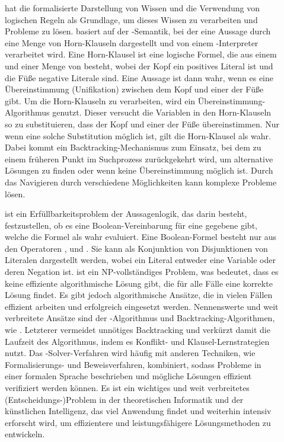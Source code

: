 \begin{description}
    \item[] hat die formalisierte Darstellung von Wissen und die Verwendung von logischen Regeln als Grundlage, um dieses Wissen zu verarbeiten und Probleme zu lösen.
     basiert auf der -Semantik, bei der eine Aussage durch eine Menge von Horn-Klauseln dargestellt und von einem -Interpreter verarbeitet wird.
    Eine Horn-Klausel ist eine logische Formel, die aus einem  und einer Menge von  besteht, wobei der Kopf ein positives Literal ist und die Füße negative Literale sind.
    Eine Aussage ist dann wahr, wenn es eine Übereinstimmung (Unifikation) zwischen dem Kopf und einer der Füße gibt.
    Um die Horn-Klauseln zu verarbeiten, wird ein Übereinstimmung-Algorithmus genutzt.
    Dieser versucht die Variablen in den Horn-Klauseln so zu substituieren, dass der Kopf und einer der Füße übereinstimmen.
    Nur wenn eine solche Substitution möglich ist, gilt die Horn-Klausel als wahr.
    Dabei kommt ein \sog Backtracking-Mechanismus zum Einsatz, bei dem zu einem früheren Punkt im Suchprozess zurückgekehrt wird, um alternative Lösungen zu finden oder wenn keine Übereinstimmung möglich ist.
    Durch das Navigieren durch verschiedene Möglichkeiten kann  komplexe Probleme lösen.

    \item[] ist ein Erfüllbarkeitsproblem der Aussagenlogik, das darin besteht, festzustellen, ob es eine Boolean-Vereinbarung für eine gegebene  gibt, welche die Formel als wahr evaluiert.
    Eine Boolean-Formel besteht nur aus den Operatoren ,  und .
    Sie kann als Konjunktion von Disjunktionen von Literalen dargestellt werden, wobei ein Literal entweder eine Variable oder deren Negation ist.
     ist ein NP-vollständiges Problem, was bedeutet, dass es keine effiziente algorithmische Lösung gibt, die für alle Fälle eine korrekte Lösung findet.
    Es gibt jedoch algorithmische Ansätze, die in vielen Fällen effizient arbeiten und erfolgreich eingesetzt werden.
    Nennenswerte und weit verbreitete Ansätze sind der -Algorithmus und Backtracking-Algorithmen, wie .
    Letzterer vermeidet unnötiges Backtracking und verkürzt damit die Laufzeit des Algorithmus, indem es Konflikt- und Klausel-Lernstrategien nutzt.
    Das -Solver-Verfahren wird häufig mit anderen Techniken, wie \zB Formalisierungs- und Beweisverfahren, kombiniert, sodass Probleme in einer formalen Sprache beschrieben und mögliche Lösungen effizient verifiziert werden können.
    Es ist ein wichtiges und weit verbreitetes (Entscheidungs-)Problem in der theoretischen Informatik und der künstlichen Intelligenz, das viel Anwendung findet und weiterhin intensiv erforscht wird, um effizientere und leistungsfähigere Lösungsmethoden zu entwickeln.


\end{description}
